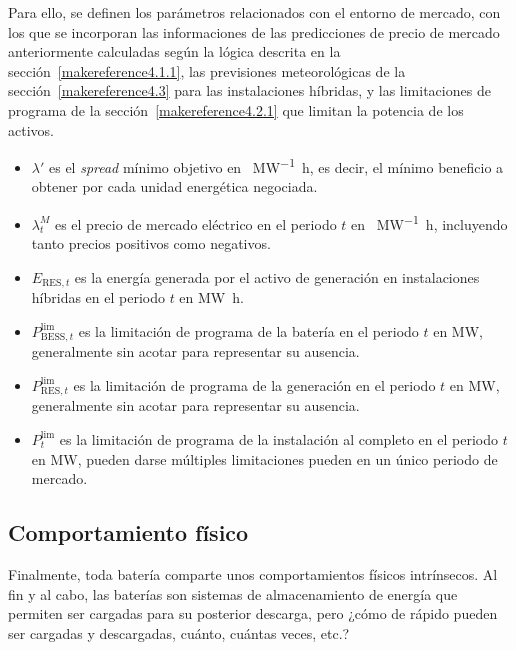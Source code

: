 Para ello, se definen los parámetros relacionados con el entorno de mercado, con los que se incorporan las informaciones de las predicciones de precio de mercado anteriormente calculadas según la lógica descrita en la sección~\ref{makereference4.1.1}, las previsiones meteorológicas de la sección~\ref{makereference4.3} para las instalaciones híbridas, y las limitaciones de programa de la sección~\ref{makereference4.2.1} que limitan la potencia de los activos.

\begin{itemize}

  \item \( \lambda' \) es el \textit{spread} mínimo objetivo en \si{\text{\euro}\per\mega\watt\hour}, es decir, el mínimo beneficio a obtener por cada unidad energética negociada.

  \item \( \lambda^{M}_{t} \) es el precio de mercado eléctrico en el periodo \( t \) en \si{\text{\euro}\per\mega\watt\hour}, incluyendo tanto precios positivos como negativos.

  \item \( E_{\text{RES}, t} \) es la energía generada por el activo de generación en instalaciones híbridas en el periodo \( t \) en \si{{\mega\watt\hour}}.

  \item \( P^{\text{lim}}_{\text{BESS}, t} \) es la limitación de programa de la batería en el periodo \( t \) en \si{\mega\watt}, generalmente sin acotar para representar su ausencia.

  \item \( P^{\text{lim}}_{\text{RES}, t} \) es la limitación de programa de la generación en el periodo \( t \) en \si{\mega\watt}, generalmente sin acotar para representar su ausencia.

  \item \( P^{\text{lim}}_{t} \) es la limitación de programa de la instalación al completo en el periodo \( t \) en \si{\mega\watt}, pueden darse múltiples limitaciones pueden en un único periodo de mercado.

\end{itemize}

\subsection{Comportamiento físico}%
\label{makereference5.1.5}

Finalmente, toda batería comparte unos comportamientos físicos intrínsecos. Al fin y al cabo, las baterías son sistemas de almacenamiento de energía que permiten ser cargadas para su posterior descarga, pero ¿cómo de rápido pueden ser cargadas y descargadas, cuánto, cuántas veces, etc.?

